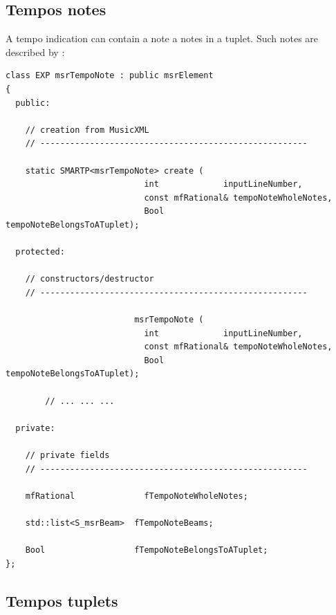 \subsection{Tempos notes}\label{Tempos notes}

A tempo indication can contain a note a notes in a tuplet. Such notes are described by :
\begin{lstlisting}[language=CPlusPlus]
class EXP msrTempoNote : public msrElement
{
  public:

    // creation from MusicXML
    // ------------------------------------------------------

    static SMARTP<msrTempoNote> create (
                            int             inputLineNumber,
                            const mfRational& tempoNoteWholeNotes,
                            Bool            tempoNoteBelongsToATuplet);

  protected:

    // constructors/destructor
    // ------------------------------------------------------

                          msrTempoNote (
                            int             inputLineNumber,
                            const mfRational& tempoNoteWholeNotes,
                            Bool            tempoNoteBelongsToATuplet);

		// ... ... ...

  private:

    // private fields
    // ------------------------------------------------------

    mfRational              fTempoNoteWholeNotes;

    std::list<S_msrBeam>  fTempoNoteBeams;

    Bool                  fTempoNoteBelongsToATuplet;
};
\end{lstlisting}

\subsection{Tempos tuplets}\label{Tempos tuplets}

